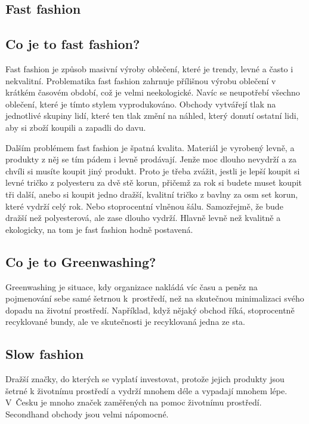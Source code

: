 \documentclass[12pt, a4paper]{article}
\begin{document}
	\begin{multicols*}{2}
		\setlength{\columnseprule}{1pt}

		\begin{center}\section*{Fast fashion}\end{center}
		\subsection*{Co je to fast fashion?}
		Fast fashion je způsob masivní výroby oblečení, které je trendy, levné a často i nekvalitní. Problematika fast fashion zahrnuje přílišnou výrobu oblečení v krátkém časovém období, což je velmi neekologické. Navíc se neupotřebí všechno oblečení, které je tímto stylem vyprodukováno. Obchody vytvářejí tlak na jednotlivé skupiny lidí, které ten tlak změní na náhled, který donutí ostatní lidi, aby si zboží koupili a zapadli do davu.

		Dalším problémem fast fashion je špatná kvalita. Materiál je vyrobený levně, a produkty z něj se tím pádem i levně prodávají. Jenže moc dlouho nevydrží a za chvíli si musíte koupit jiný produkt. Proto je třeba zvážit, jestli je lepší koupit si levné  tričko z polyesteru za dvě stě korun, přičemž za rok si budete muset koupit tři další, anebo si koupit jedno dražší, kvalitní tričko z bavlny za osm set korun, které vydrží celý rok. Nebo stoprocentní vlněnou šálu. Samozřejmě, že bude dražší než polyesterová, ale zase dlouho vydrží. Hlavně levně než kvalitně a ekologicky, na tom je fast fashion hodně postavená.

		\subsection*{Co je to Greenwashing?}
		Greenwashing je situace, kdy organizace nakládá víc času a peněz na pojmenování sebe samé šetrnou k~prostředí, než na skutečnou minimalizaci svého dopadu na životní prostředí. Například, když nějaký obchod říká, stoprocentně recyklované bundy, ale ve skutečnosti je recyklovaná jedna ze sta.

		\subsection*{Slow fashion}
		Dražší značky, do kterých se vyplatí investovat, protože jejich produkty jsou šetrné k životnímu prostředí a vydrží mnohem déle a vypadají mnohem lépe. V~Česku je mnoho značek zaměřených na pomoc životnímu prostředí. Secondhand obchody jsou velmi nápomocné.


\end{multicols*}
\end{document}
